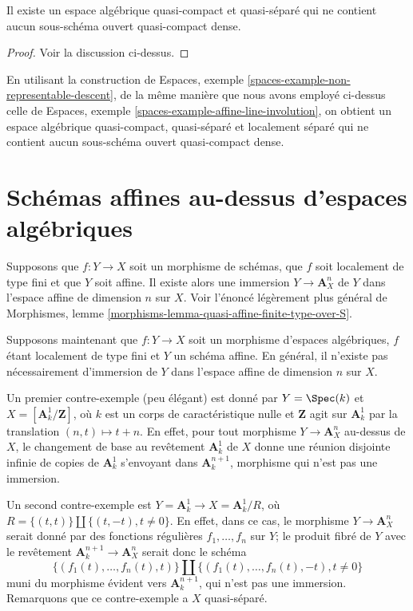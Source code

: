 \begin{lemma}
\label{lemma-nonexistence-qc-dense-open-subscheme}
Il existe un espace algébrique quasi-compact et quasi-séparé
qui ne contient aucun sous-schéma ouvert quasi-compact dense.
\end{lemma}

\begin{proof}
Voir la discussion ci-dessus.
\end{proof}

\noindent
En utilisant la construction de
Espaces, exemple \ref{spaces-example-non-representable-descent},
de la même manière que nous avons employé ci-dessus celle de
Espaces, exemple \ref{spaces-example-affine-line-involution},
on obtient un espace algébrique quasi-compact, quasi-séparé et
localement séparé qui ne contient aucun sous-schéma ouvert
quasi-compact dense.


\section{Schémas affines au-dessus d'espaces algébriques}
\label{section-embedding-affines}

\medskip\noindent
Supposons que $f : Y \to X$ soit un morphisme de schémas, que $f$
soit localement de type fini et que $Y$ soit affine. Il existe alors une immersion
$Y \to \mathbf{A}^n_X$ de $Y$ dans l'espace affine de dimension $n$ sur $X$.
Voir l'énoncé légèrement plus général de
Morphismes, lemme \ref{morphisms-lemma-quasi-affine-finite-type-over-S}.

\medskip\noindent
Supposons maintenant que $f : Y \to X$ soit un morphisme d'espaces algébriques,
$f$ étant localement de type fini et $Y$ un schéma affine. En général,
il n'existe pas nécessairement d'immersion de $Y$ dans l'espace
affine de dimension $n$ sur $X$.

\medskip\noindent
Un premier contre-exemple (peu élégant) est donné par $Y = \Spec(k)$ et
$X = [\mathbf{A}^1_k/\mathbf{Z}]$, où $k$ est un corps de caractéristique nulle
et $\mathbf{Z}$ agit sur $\mathbf{A}^1_k$ par la translation $(n, t) \mapsto t + n$.
En effet, pour tout morphisme $Y \to \mathbf{A}^n_X$ au-dessus de $X$, le changement de base
au revêtement $\mathbf{A}^1_k$ de $X$ donne une réunion disjointe infinie de copies de
$\mathbf{A}^1_k$ s'envoyant dans $\mathbf{A}^{n + 1}_k$, morphisme qui n'est pas une
immersion.

\medskip\noindent
Un second contre-exemple est $Y = \mathbf{A}^1_k \to X = \mathbf{A}^1_k/R$,
où $R = \{(t, t)\} \amalg \{(t, -t), t \not = 0\}$. En effet, dans
ce cas, le morphisme $Y \to \mathbf{A}^n_X$ serait donné par des
fonctions régulières $f_1, \ldots, f_n$ sur $Y$; le
produit fibré de $Y$ avec le revêtement
$\mathbf{A}^{n + 1}_k \to \mathbf{A}^n_X$
serait donc le schéma
$$
\{(f_1(t), \ldots, f_n(t), t)\} \amalg
\{(f_1(t), \ldots, f_n(t), -t), t \not = 0\}
$$
muni du morphisme évident vers $\mathbf{A}^{n + 1}_k$, qui n'est pas une immersion.
Remarquons que ce contre-exemple a $X$ quasi-séparé.


